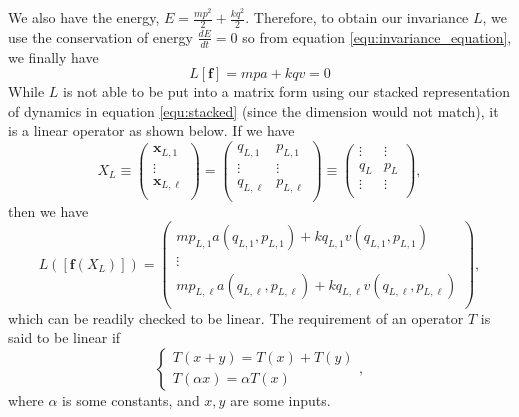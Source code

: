 \documentclass{statsmsc}
\begin{document}
We also have the energy, $E=\frac{mp^2}{2}+\frac{kq^2}{2}.$
Therefore, to obtain our invariance $L$, we use the conservation of energy $\frac{dE}{dt}=0$ so from equation \ref{equ:invariance_equation}, we finally have $$L[\mathbf{f}]=mpa+kqv=0$$
While $L$ is not able to be put into a matrix form using our stacked representation of dynamics in equation \ref{equ:stacked} (since the dimension would not match), it is a linear operator as shown below. 
If we have $$X_L\equiv\begin{pmatrix}
    \mathbf{x}_{L,1}\\
    \vdots\\
    \mathbf{x}_{L,\ell}\\
\end{pmatrix}=\begin{pmatrix}
    q_{L,1} & p_{L,1}\\
    \vdots & \vdots \\
    q_{L,\ell} & p_{L,\ell}\\
\end{pmatrix}\equiv\begin{pmatrix}
    \vdots & \vdots\\
    q_L & p_L\\
    \vdots & \vdots\\
\end{pmatrix},$$
then we have 
$$
L([\mathbf{f}(X_L)]) = \begin{pmatrix}
   mp_{L,1}a(q_{L,1},p_{L,1}) + kq_{L,1}v(q_{L,1},p_{L,1})\\ 
   \vdots \\
   mp_{L,\ell}a(q_{L,\ell},p_{L,\ell}) + kq_{L,\ell}v(q_{L,\ell},p_{L,\ell})\\ 
\end{pmatrix},
$$
which can be readily checked to be linear.
The requirement of an operator $T$ is said to be linear if 
$$
\begin{cases}
  T(x+y) = T(x)+T(y)\\
  T(\alpha x) = \alpha T(x)
\end{cases},
$$
where $\alpha$ is some constants, and $x, y$ are some inputs.
\end{document}
